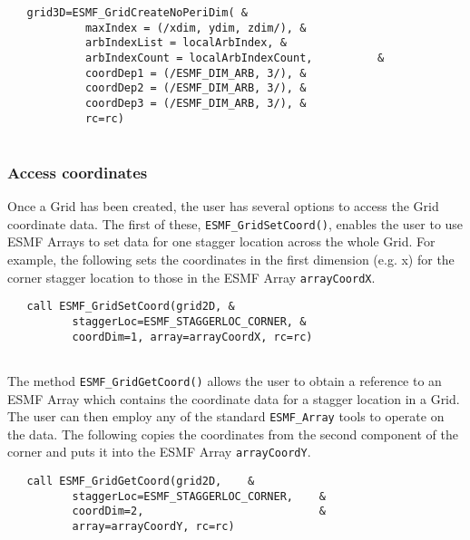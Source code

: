  \begin{verbatim}
   grid3D=ESMF_GridCreateNoPeriDim( &
            maxIndex = (/xdim, ydim, zdim/), &
            arbIndexList = localArbIndex, &
            arbIndexCount = localArbIndexCount,          &
            coordDep1 = (/ESMF_DIM_ARB, 3/), &
            coordDep2 = (/ESMF_DIM_ARB, 3/), &
            coordDep3 = (/ESMF_DIM_ARB, 3/), &
            rc=rc)
 
\end{verbatim}
 

  \subsubsection{Access coordinates}
  \label{sec:usage:coords:accessing}
  
   Once a Grid has been created, the user has several options to access
   the Grid coordinate data. The first of these, {\tt ESMF\_GridSetCoord()},
   enables the user to use ESMF Arrays to set data
   for one stagger location across the whole Grid.
   For example, the following sets the coordinates in the first dimension
   (e.g. x) for the corner stagger location to
   those in the ESMF Array {\tt arrayCoordX}. 

 \begin{verbatim}
   call ESMF_GridSetCoord(grid2D, &
          staggerLoc=ESMF_STAGGERLOC_CORNER, &
          coordDim=1, array=arrayCoordX, rc=rc)
 
\end{verbatim}
 

   The method {\tt ESMF\_GridGetCoord()} allows the user
   to obtain a reference to an ESMF Array which
   contains the coordinate data for a stagger location in a Grid. The user
   can then employ any of the standard {\tt ESMF\_Array} tools to operate
   on the data. The following copies the coordinates from the second
   component of the corner and puts it into the ESMF Array {\tt arrayCoordY}. 

 \begin{verbatim}
   call ESMF_GridGetCoord(grid2D,    &
          staggerLoc=ESMF_STAGGERLOC_CORNER,    &
          coordDim=2,                           &
          array=arrayCoordY, rc=rc)
 
\end{verbatim}
 

